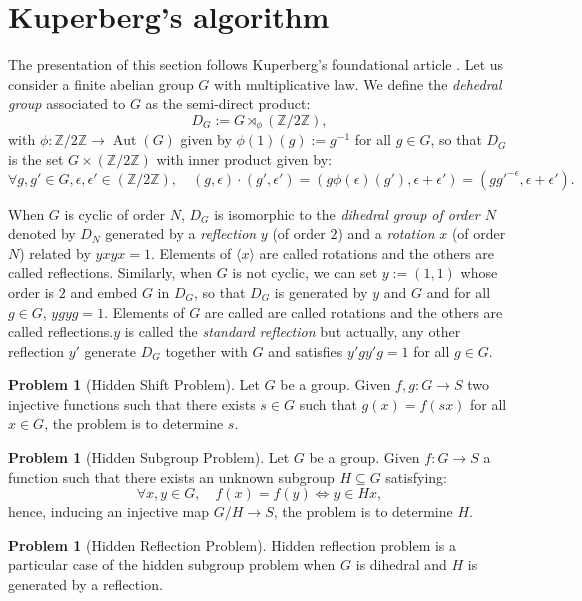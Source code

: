 \documentclass[a4paper,10pt]{report}
\theoremstyle{definition}
\theoremstyle{plain}
\theoremstyle{definition}
\newtheorem{Problem}[Definition]{Problem}
\newcommand{\Z}{\mathbb{Z}}
\renewcommand{\(}{\left(}
\renewcommand{\)}{\right)}
\DeclareMathOperator{\Aut}{Aut}
\begin{document}
\section{Kuperberg's algorithm}\label{paragraph 14}

The presentation of this section follows Kuperberg's foundational article \cite{Kuperberg}. Let us consider a finite abelian group $G$ with multiplicative law. We define the \emph{dehedral group} associated to $G$ as the semi-direct product:
\[D_G:=G\rtimes_\phi (\Z/2\Z),\]
with $\phi: \Z/2\Z\longrightarrow \Aut(G)$ given by $\phi(1)(g):=g^{-1}$ for all $g\in G$, so that $D_G$ is the set $G\times(\Z/2\Z)$ with inner product given by:
\[\forall g,g'\in G, \epsilon,\epsilon'\in(\Z/2\Z), \quad (g,\epsilon)\cdot(g',\epsilon')=(g\phi(\epsilon)(g'),\epsilon+\epsilon')=(gg'^{-\epsilon},\epsilon+\epsilon').\]

When $G$ is cyclic of order $N$, $D_G$ is isomorphic to the \emph{dihedral group of order $N$} denoted by $D_N$ generated by a \emph{reflection} $y$ (of order $2$) and a \emph{rotation} $x$ (of order $N$) related by $yxyx=1$.  Elements of $\langle x\rangle$ are called rotations and the others are called reflections. Similarly, when $G$ is not cyclic, we can set $y:=(1,1)$ whose order is $2$ and embed $G$ in $D_G$, so that $D_G$ is generated by $y$ and $G$ and for all $g\in G$, $ygyg=1$. Elements of $G$ are called are called rotations and the others are called reflections.$y$ is called the \emph{standard reflection} but actually, any other reflection $y'$ generate $D_G$ together with $G$ and satisfies $y'gy'g=1$ for all $g\in G$. 

\begin{Problem}[Hidden Shift Problem]
Let $G$ be a group. Given $f,g: G\longrightarrow S$ two injective functions such that there exists $s\in G$ such that $g(x)=f(sx)$ for all $x\in G$, the problem is to determine $s$.
\end{Problem}

\begin{Problem}[Hidden Subgroup Problem]
Let $G$ be a group. Given $f: G\longrightarrow S$ a function such that there exists an unknown subgroup $H\subseteq G$ satisfying:
\[\forall x,y\in G, \quad f(x)=f(y)\Longleftrightarrow y\in Hx,\]
hence, inducing an injective map $G/H\longrightarrow S$, the problem is to determine $H$.
\end{Problem}

\begin{Problem}[Hidden Reflection Problem]
Hidden reflection problem is a particular case of the hidden subgroup problem when $G$ is dihedral and $H$ is generated by a reflection.
\end{Problem}
\end{document}
